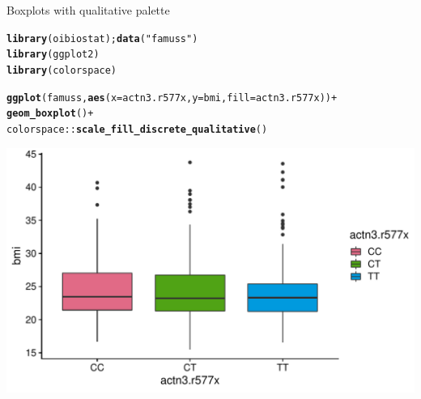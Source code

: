\documentclass[10pt]{beamer}\usepackage[]{graphicx}\usepackage[]{color}
\makeatletter
\def\maxwidth{ %
  \ifdim\Gin@nat@width>\linewidth
    \linewidth
  \else
    \Gin@nat@width
  \fi
}
\newcommand{\hlstr}[1]{\textcolor[rgb]{0.192,0.494,0.8}{#1}}%
\newcommand{\hlopt}[1]{\textcolor[rgb]{0,0,0}{#1}}%
\newcommand{\hlstd}[1]{\textcolor[rgb]{0.345,0.345,0.345}{#1}}%
\newcommand{\hlkwc}[1]{\textcolor[rgb]{0.333,0.667,0.333}{#1}}%
\newcommand{\hlkwd}[1]{\textcolor[rgb]{0.737,0.353,0.396}{\textbf{#1}}}%
\newenvironment{kframe}{%
 \def\at@end@of@kframe{}%
 \ifinner\ifhmode%
  \def\at@end@of@kframe{\end{minipage}}%
  \begin{minipage}{\columnwidth}%
 \fi\fi%
 \def\FrameCommand##1{\hskip\@totalleftmargin \hskip-\fboxsep
 \colorbox{shadecolor}{##1}\hskip-\fboxsep
     \hskip-\linewidth \hskip-\@totalleftmargin \hskip\columnwidth}%
 \MakeFramed {\advance\hsize-\width
   \@totalleftmargin\z@ \linewidth\hsize
   \@setminipage}}%
 {\par\unskip\endMakeFramed%
 \at@end@of@kframe}
\newenvironment{knitrout}{}{} %
\makeatother
\begin{document}
\begin{frame}[fragile]{Boxplots with qualitative palette}
\begin{knitrout}\tiny
{}\color{fgcolor}\begin{kframe}
\begin{alltt}
\hlkwd{library}\hlstd{(oibiostat);} \hlkwd{data}\hlstd{(}\hlstr{"famuss"}\hlstd{)}
\hlkwd{library}\hlstd{(ggplot2)}
\hlkwd{library}\hlstd{(colorspace)}

\hlkwd{ggplot}\hlstd{(famuss,} \hlkwd{aes}\hlstd{(}\hlkwc{x} \hlstd{= actn3.r577x,} \hlkwc{y} \hlstd{= bmi,} \hlkwc{fill} \hlstd{= actn3.r577x))} \hlopt{+}
\hlkwd{geom_boxplot}\hlstd{()} \hlopt{+}
\hlstd{colorspace}\hlopt{::}\hlkwd{scale_fill_discrete_qualitative}\hlstd{()}
\end{alltt}
\end{kframe}

{\centering \includegraphics[width=\maxwidth]{figure/unnamed-chunk-2-1} 

}


\end{knitrout}
\end{frame}
\end{document}
